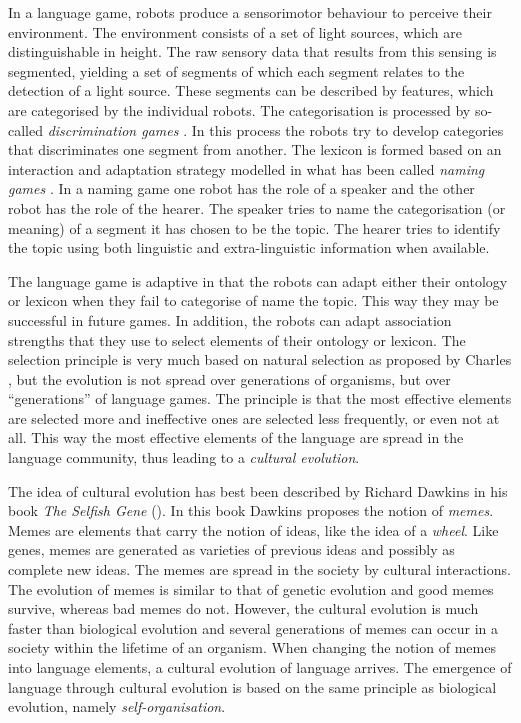 In a language game, robots produce a sensorimotor behaviour to perceive their environment. The environment consists of a set of light sources, which are distinguishable in height. The raw sensory data that results from this sensing is segmented, yielding a set of segments of which each segment relates to the detection of a light source. These segments can be described by features, which are categorised by the individual robots. The categorisation is processed by so-called {\em discrimination games} \citep{steels:1996b}. In this process the robots try to develop categories that discriminates one segment from another. The lexicon is formed based on an interaction and adaptation strategy modelled in what has been called {\em naming games} \citep{steels:1996a}. In a naming game one robot has the role of a speaker and the other robot has the role of the hearer. The speaker tries to name the categorisation (or meaning) of a segment it has chosen to be the topic. The hearer tries to identify the topic using both linguistic and extra-linguistic information when available.


The language game is adaptive in that the robots can adapt either their ontology or lexicon when they fail to categorise of name the topic. This way they may be successful in future games. In addition, the robots can adapt association strengths that they use to select elements of their ontology or lexicon. The selection principle is very much based on natural selection as proposed by Charles \citet{darwin:1968}, but the evolution is not  spread over generations of organisms, but over ``generations'' of language games. The principle is that the most effective elements are selected more and ineffective ones are selected less frequently, or even not at all. This way the most effective elements of the language are spread in the language community, thus leading to a {\em cultural evolution}.

The idea of cultural evolution has best been described by Richard Dawkins in his book {\em The Selfish Gene} (\citeyear{dawkins:1976}). In this book Dawkins proposes the notion of {\em memes}. Memes are elements that carry the notion of ideas, like the idea of a {\em wheel}. Like genes, memes are generated as varieties of previous ideas and possibly as complete new ideas. The memes are spread in the society by cultural interactions. The evolution of memes is similar to that of genetic evolution and good memes survive, whereas bad memes do not. However, the cultural evolution is much faster than biological evolution and several generations of memes can occur in a society within the lifetime of an organism. When changing the notion of memes into language elements, a cultural evolution of language arrives. The emergence of language through cultural evolution is based on the same principle as biological evolution, namely {\em self-organisation}.


